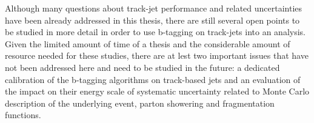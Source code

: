 Although many questions about track-jet performance and related uncertainties have been already addressed in this thesis, 
there are still several open points to be studied in more detail in order to use b-tagging on 
track-jets into an analysis. Given the limited amount of time of a thesis and the considerable amount of resource needed for 
these studies, there are at lest two important issues that  have not been addressed here and need to be studied in the future:
a dedicated calibration of the b-tagging algorithms on track-based jets  and an evaluation of the impact on 
their energy scale of  systematic uncertainty related to Monte Carlo description of the underlying event, parton showering
and fragmentation functions. 














